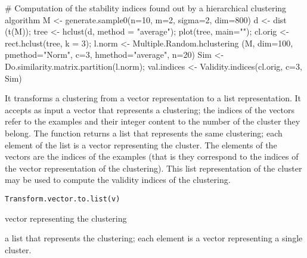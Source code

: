 \documentclass{article}
\begin{document}
\begin{Examples}
\begin{ExampleCode}
# Computation of the stability indices found out by a hierarchical clustering algorithm 
M <- generate.sample0(n=10, m=2, sigma=2, dim=800)
d <- dist (t(M)); 
tree <- hclust(d, method = "average");
plot(tree, main="");
cl.orig <- rect.hclust(tree, k = 3);
l.norm <- Multiple.Random.hclustering (M, dim=100, pmethod="Norm", 
                                       c=3, hmethod="average", n=20)
Sim <- Do.similarity.matrix.partition(l.norm);
val.indices <- Validity.indices(cl.orig, c=3, Sim)
\end{ExampleCode}
\end{Examples}

\begin{Description}\relax
It transforms  a clustering from a vector representation to a list representation.
It accepts as input a vector that represents a clustering; the indices of the vectors refer to the examples and their
integer content to the number of the cluster they belong. The function returns a list that represents the same
clustering; each element of the list is a vector representing the cluster. The elements of the vectors are the indices
of the examples (that is they correspond to the indices of the vector representation of the clustering).
This list representation of the cluster may be used to compute the validity indices of the clustering.
\end{Description}
\begin{Usage}
\begin{verbatim}
Transform.vector.to.list(v)
\end{verbatim}
\end{Usage}
\begin{Arguments}
\begin{ldescription}
\item[\code{v}] vector representing the clustering 
\end{ldescription}
\end{Arguments}
\begin{Value}
a list  that represents the clustering; each element is a vector representing a single cluster.
\end{Value}
\begin{Examples}
\end{Examples}
\end{document}
